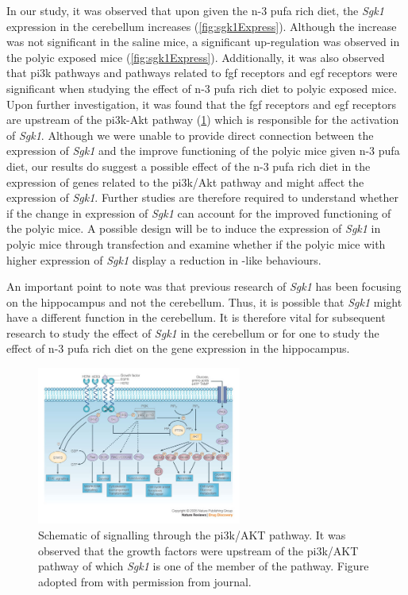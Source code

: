 In our study, it was observed that upon given the n-3 \gls{pufa} rich diet, the \textit{Sgk1} expression in the cerebellum increases (\cref{fig:sgk1Express}).
Although the increase was not significant in the saline mice, a significant up-regulation was observed in the \gls{polyic} exposed mice (\cref{fig:sgk1Express}). 
Additionally, it was also observed that \gls{pi3k} pathways and pathways related to \gls{fgf} receptors and \gls{egf} receptors were significant when studying the effect of n-3 \gls{pufa} rich diet to \gls{polyic} exposed mice.
Upon further investigation, it was found that the \gls{fgf} receptors and \gls{egf} receptors are upstream of the \gls{pi3k}-Akt pathway (\cref{fig:pi3kPathway}) which is responsible for the activation of \textit{Sgk1}.
Although we were unable to provide direct connection between the expression of \textit{Sgk1} and the improve functioning of the \gls{polyic} mice given n-3 \gls{pufa} diet, our results do suggest a possible effect of the n-3 \gls{pufa} rich diet in the expression of genes related to the \gls{pi3k}/Akt pathway and might affect the expression of \textit{Sgk1}.
Further studies are therefore required to understand whether if the change in expression of \textit{Sgk1} can account for the improved functioning of the \gls{polyic} mice. 
A possible design will be to induce the expression of \textit{Sgk1} in \gls{polyic} mice through transfection and examine whether if the \gls{polyic} mice with higher expression of \textit{Sgk1} display a reduction in -like behaviours.

An important point to note was that previous research of \textit{Sgk1} has been focusing on the hippocampus and not the cerebellum. 
Thus, it is possible that \textit{Sgk1} might have a different function in the cerebellum. 
It is therefore vital for subsequent research to study the effect of \textit{Sgk1} in the cerebellum or for one to study the effect of n-3 \gls{pufa} rich diet on the gene expression in the hippocampus. 

\begin{figure}
	\centering
	\includegraphics[width=0.6\textwidth]{figure/omega/pi3ksignaling.jpg}
	\caption[Schematic of signalling through the PI3K/AKT pathway]{
		Schematic of signalling through the \gls{pi3k}/AKT pathway.
		It was observed that the growth factors were upstream of the \gls{pi3k}/AKT pathway of which \textit{Sgk1} is one of the member of the pathway.
		Figure adopted from \citet{Hennessy2005} with permission from journal.
	}\label{fig:pi3kPathway}
\end{figure}
